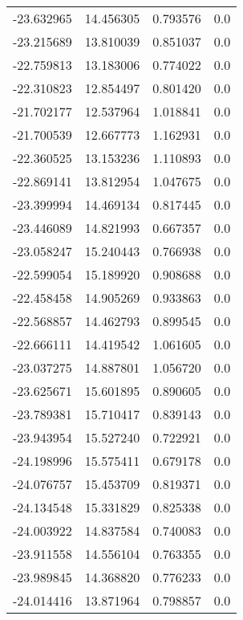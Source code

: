 \begin{tabular}{rrrr}
      -23.632965 &        14.456305 &    0.793576 &   0.0 \\
      -23.215689 &        13.810039 &    0.851037 &   0.0 \\
      -22.759813 &        13.183006 &    0.774022 &   0.0 \\
      -22.310823 &        12.854497 &    0.801420 &   0.0 \\
      -21.702177 &        12.537964 &    1.018841 &   0.0 \\
      -21.700539 &        12.667773 &    1.162931 &   0.0 \\
      -22.360525 &        13.153236 &    1.110893 &   0.0 \\
      -22.869141 &        13.812954 &    1.047675 &   0.0 \\
      -23.399994 &        14.469134 &    0.817445 &   0.0 \\
      -23.446089 &        14.821993 &    0.667357 &   0.0 \\
      -23.058247 &        15.240443 &    0.766938 &   0.0 \\
      -22.599054 &        15.189920 &    0.908688 &   0.0 \\
      -22.458458 &        14.905269 &    0.933863 &   0.0 \\
      -22.568857 &        14.462793 &    0.899545 &   0.0 \\
      -22.666111 &        14.419542 &    1.061605 &   0.0 \\
      -23.037275 &        14.887801 &    1.056720 &   0.0 \\
      -23.625671 &        15.601895 &    0.890605 &   0.0 \\
      -23.789381 &        15.710417 &    0.839143 &   0.0 \\
      -23.943954 &        15.527240 &    0.722921 &   0.0 \\
      -24.198996 &        15.575411 &    0.679178 &   0.0 \\
      -24.076757 &        15.453709 &    0.819371 &   0.0 \\
      -24.134548 &        15.331829 &    0.825338 &   0.0 \\
      -24.003922 &        14.837584 &    0.740083 &   0.0 \\
      -23.911558 &        14.556104 &    0.763355 &   0.0 \\
      -23.989845 &        14.368820 &    0.776233 &   0.0 \\
      -24.014416 &        13.871964 &    0.798857 &   0.0 \\

\end{tabular}
